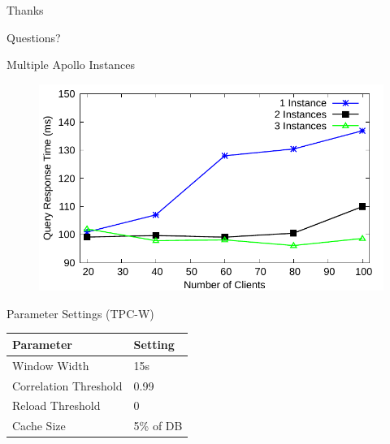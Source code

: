\documentclass[10pt]{beamer}
\begin{document}
\begin{frame}[fragile]{Thanks}
\begin{centering}
Questions?
\end{centering}
\end{frame}

\begin{frame}[fragile]{Multiple Apollo Instances}
    \begin{figure}
        \center
        \includegraphics[scale=0.7]{apollo_scalability_curve}
    \end{figure}
\end{frame}

\begin{frame}[fragile]{Parameter Settings (TPC-W)}
\begin{table}
\centering
\begin{tabular}{ll}
Parameter & Setting \\
\toprule
Window Width & 15s \\
Correlation Threshold & 0.99 \\
Reload Threshold & 0 \\
Cache Size & 5\% of DB \\
\bottomrule
\end{tabular}
\end{table}

\end{frame}
\end{document}
